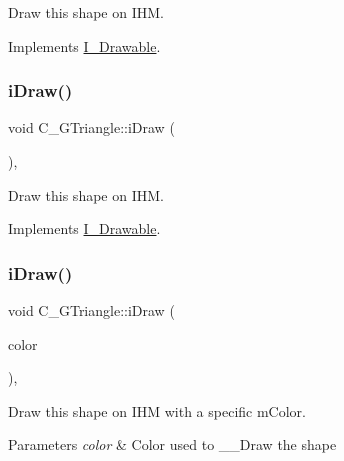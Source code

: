 Draw this shape on I\+HM. 



Implements \hyperlink{classI__Drawable_ae24c65000977a805f52ce032321cd86f}{I\+\_\+\+Drawable}.

\mbox{\label{classC__GTriangle_a53abbd8cd622323fc2f3b80ce91cfde9}} 
\subsubsection{\texorpdfstring{i\+Draw()}{iDraw()}\hspace{0.1cm}{\footnotesize\ttfamily [2/4]}}
{\footnotesize\ttfamily void C\+\_\+\+G\+Triangle\+::i\+Draw (\begin{DoxyParamCaption}{ }\end{DoxyParamCaption})\hspace{0.3cm}{\ttfamily [override]}, {\ttfamily [virtual]}}



Draw this shape on I\+HM. 



Implements \hyperlink{classI__Drawable_ae24c65000977a805f52ce032321cd86f}{I\+\_\+\+Drawable}.

\mbox{\label{classC__GTriangle_a9cfd20cb1d19e6c92bd217c470c86405}} 
\subsubsection{\texorpdfstring{i\+Draw()}{iDraw()}\hspace{0.1cm}{\footnotesize\ttfamily [3/4]}}
{\footnotesize\ttfamily void C\+\_\+\+G\+Triangle\+::i\+Draw (\begin{DoxyParamCaption}\item[{M\+L\+V\+\_\+\+Color}]{color }\end{DoxyParamCaption})\hspace{0.3cm}{\ttfamily [override]}, {\ttfamily [virtual]}}



Draw this shape on I\+HM with a specific m\+Color. 


\begin{DoxyParams}{Parameters}
{\em color} & Color used to \+\_\+\+\_\+\+Draw the shape \\
\hline
\end{DoxyParams}


